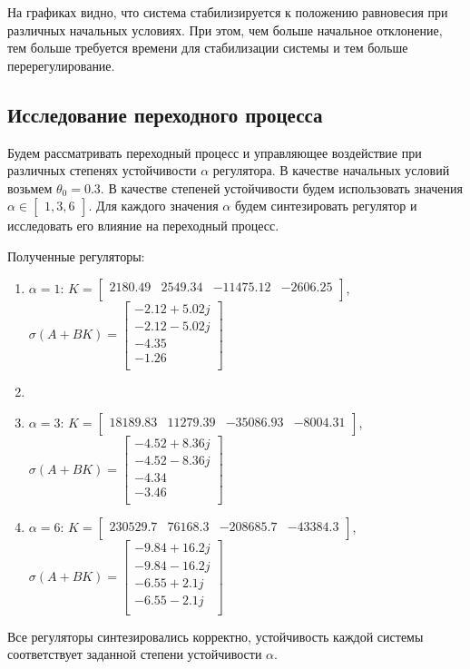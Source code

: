 На графиках видно, что система стабилизируется к положению равновесия при различных начальных условиях. При этом, 
чем больше начальное отклонение, тем больше требуется времени для стабилизации системы и тем больше перерегулирование. 

\subsection{Исследование переходного процесса} 
Будем рассматривать переходный процесс и управляющее воздействие при различных степенях устойчивости $\alpha$ регулятора. 
В качестве начальных условий возьмем $\theta_0 = 0.3$. В качестве степеней устойчивости будем использовать 
значения $\alpha \in \begin{bmatrix} 1, 3, 6\end{bmatrix}$. Для каждого значения $\alpha$ будем 
синтезировать регулятор и исследовать его влияние на переходный процесс. 

Полученные регуляторы: 
\begin{enumerate}
    \item $\alpha = 1$: $K = \begin{bmatrix} 2180.49  & 2549.34  & -11475.12  & -2606.25 \\ \end{bmatrix}$, $\sigma(A + BK) = \begin{bmatrix} -2.12 + 5.02j \\ -2.12 - 5.02j \\ -4.35 \\ -1.26 \\  \end{bmatrix}$
    \item \item $\alpha = 3$: $K = \begin{bmatrix} 18189.83  & 11279.39  & -35086.93  & -8004.31 \\ \end{bmatrix}$, $\sigma(A + BK) = \begin{bmatrix} -4.52 + 8.36j \\ -4.52 - 8.36j \\ -4.34 \\ -3.46 \\  \end{bmatrix}$
    \item $\alpha = 6$: $K = \begin{bmatrix} 230529.7  & 76168.3  & -208685.7  & -43384.3 \\ \end{bmatrix}$, $\sigma(A + BK) = \begin{bmatrix} -9.84 + 16.2j \\ -9.84 - 16.2j \\ -6.55 + 2.1j \\ -6.55 - 2.1j \\ \end{bmatrix}$
\end{enumerate}
Все регуляторы синтезировались корректно, устойчивость каждой системы соответствует заданной степени устойчивости $\alpha$. 

